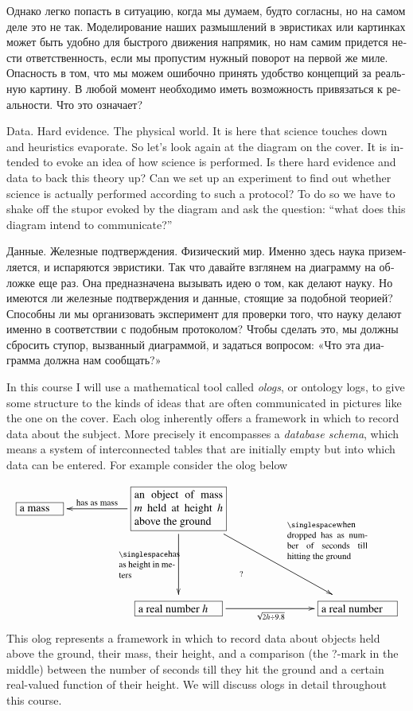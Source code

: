 \documentclass[a4paper]{book}
\def\tn{\textnormal}
\newcommand{\LA}[2]{\ar[#1]^-{\tn {#2}}}
\newcommand{\LAL}[2]{\ar[#1]_-{\tn {#2}}}
\newcommand{\obox}[3]{\stackrel{#1}{\fbox{\parbox{#2}{#3}}}}
\theoremstyle{myth}
\begin{document}
\begin{english}
\begin{russian} Однако легко попасть в ситуацию, когда мы думаем, будто согласны, но на самом деле это не так. Моделирование наших размышлений в эвристиках или картинках может быть удобно для быстрого движения напрямик, но нам самим придется нести ответственность, если мы пропустим нужный поворот на первой же миле. Опасность в том, что мы можем ошибочно принять удобство концепций за реальную картину. В любой момент необходимо иметь возможность привязаться к реальности. Что это означает? \end{russian}

Data. Hard evidence. The physical world. It is here that science touches down and heuristics evaporate. So let's look again at the diagram on the cover. It is intended to evoke an idea of how science is performed. Is there hard evidence and data to back this theory up? Can we set up an experiment to find out whether science is actually performed according to such a protocol? To do so we have to shake off the stupor evoked by the diagram and ask the question: “what does this diagram intend to communicate?”

\begin{russian} Данные. Железные подтверждения. Физический мир. Именно здесь наука приземляется, и испаряются эвристики. Так что давайте взглянем на диаграмму на обложке еще раз. Она предназначена вызывать идею о том, как делают науку. Но имеются ли железные подтверждения и данные, стоящие за подобной теорией? Способны ли мы организовать эксперимент для проверки того, что науку делают именно в соответствии с подобным протоколом? Чтобы сделать это, мы должны сбросить ступор, вызванный диаграммой, и задаться вопросом: «Что эта диаграмма должна нам сообщать?» \end{russian}

In this course I will use a mathematical tool called {\em ologs}, or ontology logs, to give some structure to the kinds of ideas that are often communicated in pictures like the one on the cover. Each olog inherently offers a framework in which to record data about the subject. More precisely it encompasses a {\em database schema}, which means a system of interconnected tables that are initially empty but into which data can be entered. For example consider the olog below
$$\xymatrix{
\obox{}{.5in}{a mass}&&\obox{}{1.1in}{an object of mass $m$ held at height $h$ above the ground}\LAL{ll}{\footnotesize has as mass}\LA{rrdd}{\hspace{.4in}\parbox{1in}{\singlespace\footnotesize when dropped has as number of seconds till hitting the ground}}\LAL{dd}{\parbox{.7in}{\singlespace\footnotesize has as height in meters}}&&\\\\
&&\obox{}{1in}{a real number $h$}\ar@{}[uurr]|(.35){?}\ar[rr]_-{\sqrt{2h\div 9.8}}&\hspace{.3in}&\obox{}{.9in}{a real number}
}
$$
This olog represents a framework in which to record data about objects held above the ground, their mass, their height, and a comparison (the ?-mark in the middle) between the number of seconds till they hit the ground and a certain real-valued function of their height. We will discuss ologs in detail throughout this course.


\end{english}
\end{document}
